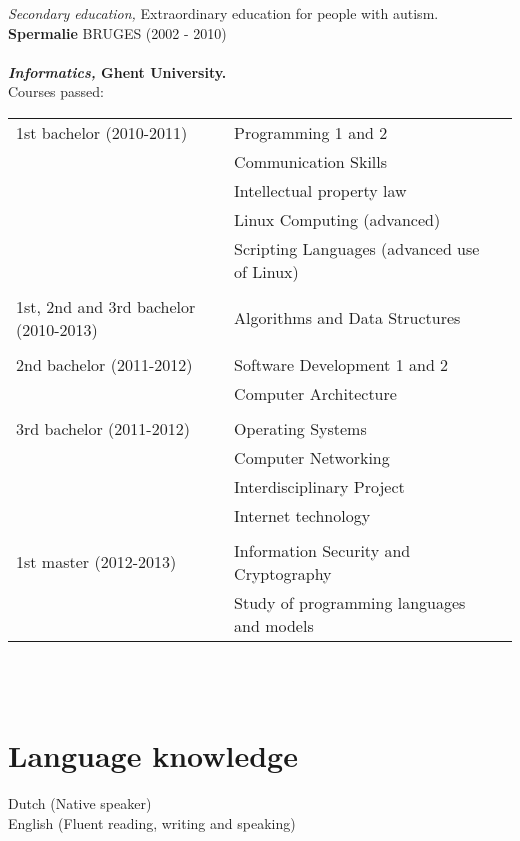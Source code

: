 \documentclass[margin, 10pt]{res} %
\begin{document}
\begin{resume}
{\sl Secondary education,} Extraordinary education for people with autism.\\
\textbf{Spermalie} BRUGES (2002 - 2010)
\\ \\
\textbf{{\sl Informatics,} Ghent University.\\}
Courses passed:\\
\begin{tabular}{l l l}
1st bachelor (2010-2011) & Programming 1 and 2 \\
                         & Communication Skills \\
                         & Intellectual property law \\
                         & Linux Computing (advanced) \\
                         & Scripting Languages (advanced use of Linux) \\
\\
1st, 2nd and 3rd bachelor (2010-2013) & Algorithms and Data Structures \\
\\
2nd bachelor (2011-2012) & Software Development 1 and 2 \\
                         & Computer Architecture \\
\\
3rd bachelor (2011-2012) & Operating Systems \\
                         & Computer Networking \\
                         & Interdisciplinary Project \\
                         & Internet technology \\
\\
1st master (2012-2013) & Information Security and Cryptography \\
                       & Study of programming languages and models \\
\end{tabular}
\\ \\
\section{Language knowledge}
Dutch (Native speaker) \\
English (Fluent reading, writing and speaking)
 


\end{resume}
\end{document}
